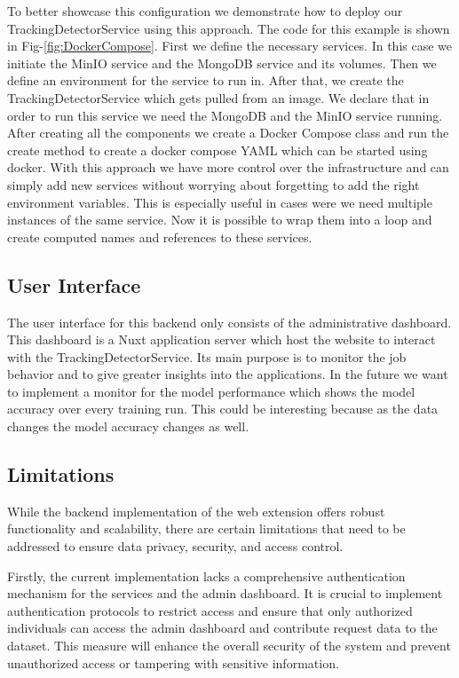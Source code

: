 To better showcase this configuration we demonstrate how to deploy our TrackingDetectorService using this approach. The code for this 
example is shown in Fig-\ref{fig:DockerCompose}. First we define the necessary services. In this case we initiate the MinIO service and 
the MongoDB service and its volumes. Then we define an environment for the service to run in.  After that, we create the TrackingDetectorService which gets pulled from an image. We declare that 
in order to run this service we need the MongoDB and the MinIO service running. After creating all the components we create a Docker Compose class
and run the create method to create a docker compose YAML which can be started using docker. With this approach we have more control over the 
infrastructure and can simply add new services without worrying about forgetting to add the right environment variables. This is especially useful
in cases were we need multiple instances of the same service. Now it is possible to wrap them into a loop and create computed names and references
to these services. 


\subsection{User Interface}

The user interface for this backend only consists of the administrative dashboard. This dashboard is a Nuxt application server which host the website to interact with the TrackingDetectorService. Its main purpose is to monitor the job behavior and to give greater insights into
the applications. In the future we want to implement a monitor for the model performance which shows the model accuracy over every training run.
This could be interesting because as the data changes the model accuracy changes as well.

\subsection{Limitations}
While the backend implementation of the web extension offers robust functionality and scalability, there are certain limitations
that need to be addressed to ensure data privacy, security, and access control.

Firstly, the current implementation lacks a comprehensive authentication mechanism for the services and the admin dashboard.
It is crucial to implement authentication protocols to restrict access and ensure that only authorized individuals can access
the admin dashboard and contribute request data to the dataset. This measure will enhance the overall security of the system
and prevent unauthorized access or tampering with sensitive information.

